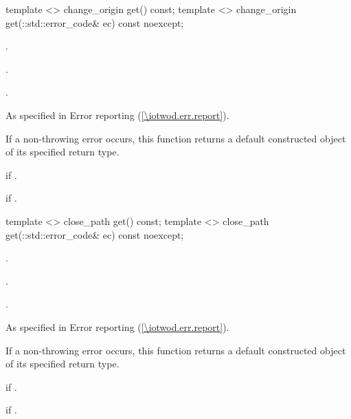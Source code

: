 \begin{itemdecl}
    template <>
    change_origin get() const;
    template <>
    change_origin get(::std::error_code& ec) const noexcept;
\end{itemdecl}
\begin{itemdescr}
	\pnum
	\preconditions
	.
	
	\pnum
	.
	
	\pnum
	\returns
	.
	
	\pnum
	\throws
	As specified in Error reporting (\ref{\iotwod.err.report}).
	
	\pnum
	\remarks
	If a non-throwing error occurs, this function returns a default constructed object of its specified return type.
	
	\pnum
	\errors
	 if .
	
	\pnum
	 if .

\end{itemdescr}

\begin{itemdecl}
    template <>
    close_path get() const;
    template <>
    close_path get(::std::error_code& ec) const noexcept;
\end{itemdecl}
\begin{itemdescr}
	\pnum
	\preconditions
	.
	
	\pnum
	.
	
	\pnum
	\returns
	.
	
	\pnum
	\throws
	As specified in Error reporting (\ref{\iotwod.err.report}).
	
	\pnum
	\remarks
	If a non-throwing error occurs, this function returns a default constructed object of its specified return type.
	
	\pnum
	\errors
	 if .
	
	\pnum
	 if .

\end{itemdescr}

